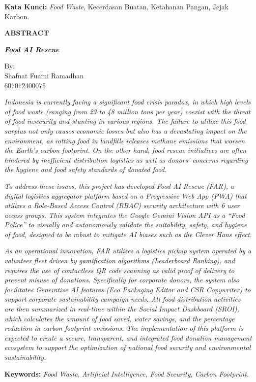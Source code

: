 \noindent \textbf{Kata Kunci:} \textit{Food Waste}, Kecerdasan Buatan, Ketahanan Pangan, Jejak Karbon.

\newpage
\begin{center}
    {\Large\bfseries ABSTRACT \par}
    {\large\bfseries\itshape Food AI Rescue \par}
    By: \\
    Shafnat Fuaini Ramadhan \\
    607012400075 \\
\end{center}
\textit{Indonesia is currently facing a significant food crisis paradox, in which high levels of food waste (ranging from 23 to 48 million tons per year) coexist with the threat of food insecurity and stunting in various regions. The failure to utilize this food surplus not only causes economic losses but also has a devastating impact on the environment, as rotting food in landfills releases methane emissions that worsen the Earth’s carbon footprint. On the other hand, food rescue initiatives are often hindered by inefficient distribution logistics as well as donors’ concerns regarding the hygiene and food safety standards of donated food.}

\textit{To address these issues, this project has developed Food AI Rescue (FAR), a digital logistics aggregator platform based on a Progressive Web App (PWA) that utilizes a Role-Based Access Control (RBAC) security architecture with 6 user access groups. This system integrates the Google Gemini Vision API as a ``Food Police'' to visually and autonomously validate the suitability, safety, and hygiene of food, designed to be robust to mitigate AI biases such as the Clever Hans effect.}

\textit{As an operational innovation, FAR utilizes a logistics pickup system operated by a volunteer fleet driven by gamification algorithms (Leaderboard Ranking), and requires the use of contactless QR code scanning as valid proof of delivery to prevent misuse of donations. Specifically for corporate donors, the system also facilitates Generative AI features (Eco Packaging Editor and CSR Copywriter) to support corporate sustainability campaign needs. All food distribution activities are then summarized in real-time within the Social Impact Dashboard (SROI), which calculates the amount of food saved, water savings, and the percentage reduction in carbon footprint emissions. The implementation of this platform is expected to create a secure, transparent, and integrated food donation management ecosystem to support the optimization of national food security and environmental sustainability.}

\noindent \textbf{Keywords:} \textit{Food Waste, Artificial Intelligence, Food Security, Carbon Footprint.}

\newpage
\tableofcontents
\newpage
\listoffigures
\newpage
\listoftables
\newpage